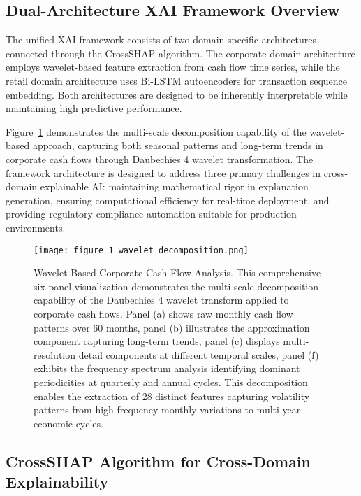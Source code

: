 \documentclass[a4paper,11pt,twoside]{article}
\newcommand{\0}{\Bf{0}}
\theoremstyle{definition}
\begin{document}
\subsection{Dual-Architecture XAI Framework Overview}

The unified XAI framework consists of two domain-specific architectures connected through the CrossSHAP algorithm. The corporate domain architecture employs wavelet-based feature extraction from cash flow time series, while the retail domain architecture uses Bi-LSTM autoencoders for transaction sequence embedding. Both architectures are designed to be inherently interpretable while maintaining high predictive performance.

Figure~\ref{fig:wavelet_decomposition} demonstrates the multi-scale decomposition capability of the wavelet-based approach, capturing both seasonal patterns and long-term trends in corporate cash flows through Daubechies 4 wavelet transformation. The framework architecture is designed to address three primary challenges in cross-domain explainable AI: maintaining mathematical rigor in explanation generation, ensuring computational efficiency for real-time deployment, and providing regulatory compliance automation suitable for production environments.

\begin{figure}
\centering
\texttt{[image: figure\_1\_wavelet\_decomposition.png]}
\caption{Wavelet-Based Corporate Cash Flow Analysis. This comprehensive six-panel visualization demonstrates the multi-scale decomposition capability of the Daubechies 4 wavelet transform applied to corporate cash flows. Panel (a) shows raw monthly cash flow patterns over 60 months, panel (b) illustrates the approximation component capturing long-term trends, panel (c) displays multi-resolution detail components at different temporal scales, panel (f) exhibits the frequency spectrum analysis identifying dominant periodicities at quarterly and annual cycles. This decomposition enables the extraction of 28 distinct features capturing volatility patterns from high-frequency monthly variations to multi-year economic cycles.}
\label{fig:wavelet_decomposition}
\end{figure}

\subsection{CrossSHAP Algorithm for Cross-Domain Explainability}
\end{document}
